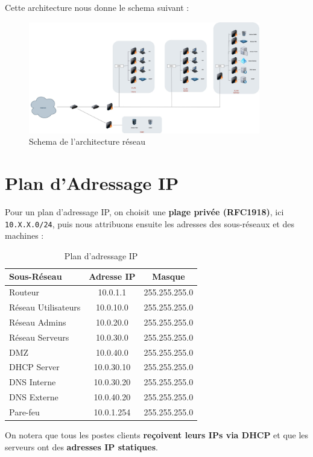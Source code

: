 \documentclass[../Livrable1.tex]{subfiles}
\begin{document}
Cette architecture nous donne le schema suivant : 
\begin{figure}[h]
    \centering
    \includegraphics[width=0.9\textwidth]{../images/Architecture.jpg}
    \caption{Schema de l'architecture réseau}
    \label{fig:architecture}
\end{figure}

\section*{Plan d’Adressage IP}

Pour un plan d’adressage IP, on choisit une \textbf{plage privée (RFC1918)}, ici \texttt{10.X.X.0/24}, puis nous attribuons ensuite les adresses des sous-réseaux et des machines :

\begin{table}[h]
    \centering
    \begin{tabular}{|l|c|c|}
        \hline
        \textbf{Sous-Réseau} & \textbf{Adresse IP} & \textbf{Masque} \\
        \hline
        Routeur & 10.0.1.1 & 255.255.255.0 \\
        Réseau Utilisateurs & 10.0.10.0 & 255.255.255.0 \\
        Réseau Admins & 10.0.20.0 & 255.255.255.0 \\
        Réseau Serveurs & 10.0.30.0 & 255.255.255.0 \\
        DMZ & 10.0.40.0 & 255.255.255.0 \\
        DHCP Server & 10.0.30.10 & 255.255.255.0 \\
        DNS Interne & 10.0.30.20 & 255.255.255.0 \\
        DNS Externe & 10.0.40.20 & 255.255.255.0 \\
        Pare-feu & 10.0.1.254 & 255.255.255.0 \\
        \hline
    \end{tabular}
    \caption{Plan d’adressage IP}
\end{table}

On notera que tous les postes clients \textbf{reçoivent leurs IPs via DHCP} et que les serveurs ont des \textbf{adresses IP statiques}.
\end{document}
